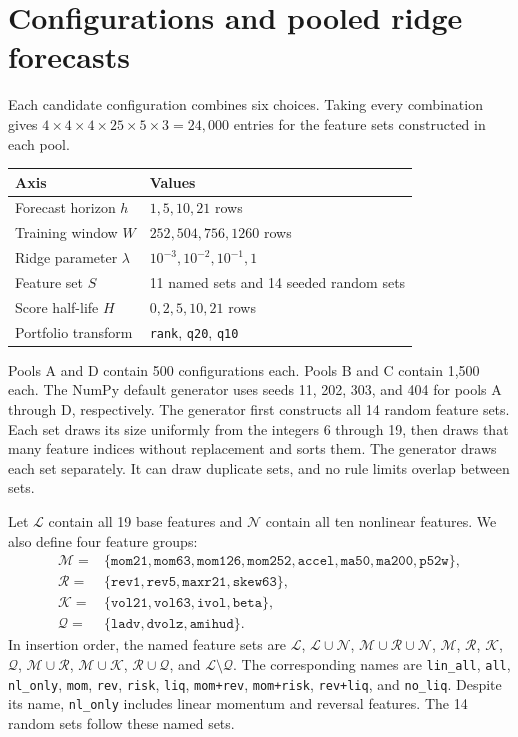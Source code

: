 \documentclass[10pt,letterpaper]{article}
\begin{document}
\section{Configurations and pooled ridge forecasts}\label{sec:fit}
Each candidate configuration combines six choices. Taking every combination gives
$4\times4\times4\times25\times5\times3=24{,}000$ entries for the feature sets constructed in each pool.
\begin{center}
\begin{tabular}{@{}ll@{}}
\toprule
Axis & Values\\
\midrule
Forecast horizon $h$ & $1,5,10,21$ rows\\
Training window $W$ & $252,504,756,1260$ rows\\
Ridge parameter $\lambda$ & $10^{-3},10^{-2},10^{-1},1$\\
Feature set $S$ & 11 named sets and 14 seeded random sets\\
Score half-life $H$ & $0,2,5,10,21$ rows\\
Portfolio transform & \texttt{rank}, \texttt{q20}, \texttt{q10}\\
\bottomrule
\end{tabular}
\end{center}
Pools A and D contain 500 configurations each. Pools B and C contain 1,500 each. The NumPy default generator uses seeds 11, 202, 303, and 404 for pools A through D, respectively. The generator first constructs all 14 random feature sets. Each set draws its size uniformly from the integers 6 through 19, then draws that many feature indices without replacement and sorts them. The generator draws each set separately. It can draw duplicate sets, and no rule limits overlap between sets.

Let $\mathcal L$ contain all 19 base features and $\mathcal N$ contain all ten nonlinear features. We also define four feature groups:
\begin{align*}
\mathcal M={}&\{\texttt{mom21},\texttt{mom63},\texttt{mom126},\texttt{mom252},
\texttt{accel},\texttt{ma50},\texttt{ma200},\texttt{p52w}\},\\
\mathcal R={}&\{\texttt{rev1},\texttt{rev5},\texttt{maxr21},\texttt{skew63}\},\\
\mathcal K={}&\{\texttt{vol21},\texttt{vol63},\texttt{ivol},\texttt{beta}\},\\
\mathcal Q={}&\{\texttt{ladv},\texttt{dvolz},\texttt{amihud}\}.
\end{align*}
In insertion order, the named feature sets are $\mathcal L$, $\mathcal L\cup\mathcal N$, $\mathcal M\cup\mathcal R\cup\mathcal N$, $\mathcal M$, $\mathcal R$, $\mathcal K$, $\mathcal Q$, $\mathcal M\cup\mathcal R$, $\mathcal M\cup\mathcal K$, $\mathcal R\cup\mathcal Q$, and $\mathcal L\setminus\mathcal Q$. The corresponding names are \texttt{lin\_all}, \texttt{all}, \texttt{nl\_only}, \texttt{mom}, \texttt{rev}, \texttt{risk}, \texttt{liq}, \texttt{mom+rev}, \texttt{mom+risk}, \texttt{rev+liq}, and \texttt{no\_liq}. Despite its name, \texttt{nl\_only} includes linear momentum and reversal features. The 14 random sets follow these named sets.
\end{document}
